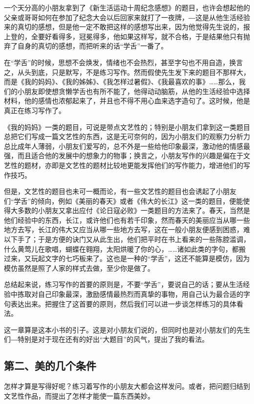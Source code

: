 \documentclass[fontset=fandol,12pt,a5paper]{ctexbook}
\begin{document}
一个天分高的小朋友拿到了《新生活运动十周纪念感想》的题目，也许会想起他的父亲或哥哥如何在参加了纪念大会以后回家来就打了一夜牌，―这是从他生活经验来的真切的感想，但是他一定不敢把这样的感想写出来，因为他觉得先生说的，报上登的，全要好看得多，冠冕得多，他如果这样写，就不合格，于是结果他只有抛弃了自身的真切的感想，而把听来的话“学舌”一番了。

在“学舌”的时候，思想不会焕发，情绪也不会热烈，甚至字句也不用自造，换言之，从头到底，只是默写，不是练习写作。然而假使先生发下来的题目不那样大，而是《我的妈妈》、《我的姊姊》、《我怎样过暑假》、《我最喜欢的事》……那么，我们的小朋友即使想贪懒学舌也有所不能了，他得动动脑筋，从他的生活经验中选择材料，他的感情也浓郁起来了，并且也不得不用心血来选字造句了。这时候，他是真正在练习写作了。

《我的妈妈》一类的题目，可说是带点文艺性的；特别是小朋友们拿到这一类题目总把它们写成一篇文艺性的东西，这是无可奈何的，因为小朋友们的观察力分析力总比成年人薄弱，小朋友们爱写的，总不外是一些给他印象最深，激动他的情感最强，而且适合他的发展中的想象力的物事；换言之，小朋友写作的兴趣是偏在于文艺性的题材，亦即是文艺性的题材比较地更能发挥他们的写作能力，增进他们的写作技巧。

但是，文艺性的题目也未可一概而论，有一些文艺性的题目也会诱起了小朋友们“学舌”的倾向，例如《美丽的春天》或者《伟大的长江》这一类的题目，便能使得大多数的小朋友又拿出应付《论日寇必败》一类题目的方法来了。春天，当然是他们经验中的东西，长江，或许他们也有若千印象，然而春天的美丽应当从哪一些地方去写，长江的伟大又应当从哪一些地方去写，这在一般小朋友便感到困惑，难以下手了；于是方便的诀门又从此生出，他们把平时在书上看来的一些陈腔滥调，什么黄莺儿在歌唱，蝴蝶在翱翔，太阳烘暖了你的心，……诸如此类的字句，都搬过来，又玩起文字的七巧板来了。这也是一种的“学舌”，这还不能算是模仿，因为模仿虽然是照了人家的样式去做，至少你是做了。

总结起来说，练习写作的首要的原则是，不要“学舌”，要说自己的话；要从生活经验中拣取对自己印象最深，激励感情最热烈而真挚的事物，用自己认为最合适的字句表达出来。把握住了这首要的原则，然后我们可以进一步谈怎样练习的具体看法。

这一章算是这本小书的引子。这是对小朋友们说的，但同时也是对小朋友们的先生们―特别是对于现在还有的好出“大题目”的风气，提出了我的看法。

\subsection{第二、美的几个条件}
怎样才算是写得好呢？练习着写作的小朋友大都会这样发问。或者，把问题归结到文艺性作品，而提出了怎样才能使一篇东西美妙。
\end{document}
